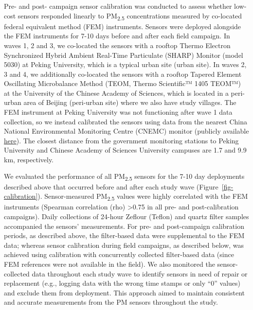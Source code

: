 \documentclass[
  letterpaper,
  DIV=11,
  numbers=noendperiod]{scrartcl}
\begin{document}
Pre- and post- campaign sensor calibration was conducted
to assess whether low-cost sensors responded linearly to
PM\textsubscript{2.5} concentrations measured by co-located federal
equivalent method (FEM) instruments. Sensors were deployed alongside the
FEM instruments for 7-10 days before and after each field campaign. In
waves 1, 2 and 3, we co-located the sensors with a rooftop Thermo
Electron Synchronized Hybrid Ambient Real-Time Particulate (SHARP)
Monitor (model 5030) at Peking University, which is a typical urban site
(urban site). In waves 2, 3 and 4, we additionally co-located the
sensors with a rooftop Tapered Element Oscillating Microbalance Method
(TEOM, Thermo Scientific™ 1405 TEOM™) at the University of the Chinese
Academy of Sciences, which is located in a peri-urban area of Beijing
(peri-urban site) where we also have study villages. The FEM instrument
at Peking University was not functioning after wave 1 data collection,
so we instead calibrated the sensors using data from the nearest China
National Environmental Monitoring Centre (CNEMC) monitor (publicly
available \href{https://quotsoft.net/air}{here}). The closest distance
from the government monitoring stations to Peking University and Chinese
Academy of Sciences University campuses are 1.7 and 9.9 km,
respectively.

We evaluated the performance of all PM\textsubscript{2.5}
sensors for the 7-10 day deployments described above that occurred
before and after each study wave (Figure~\ref{fig-calibration}).
Sensor-measured PM\textsubscript{2.5} values were highly correlated with
the FEM instruments (Spearman correlation (rho) \textgreater0.75 in all
pre- and post-calibration campaigns). Daily collections of 24-hour
Zeflour (Teflon) and quartz filter samples accompanied the sensors'
measurements. For pre- and post-campaign calibration periods, as
described above, the filter-based data were supplemental to the FEM
data; whereas sensor calibration during field campaigns, as described
below, was achieved using calibration with concurrently collected
filter-based data (since FEM references were not available in the
field). We also monitored the sensor-collected data throughout each
study wave to identify sensors in need of repair or replacement (e.g.,
logging data with the wrong time stamps or only ``0'' values) and
exclude them from deployment. This approach aimed to maintain consistent
and accurate measurements from the PM sensors throughout the study.
\end{document}
